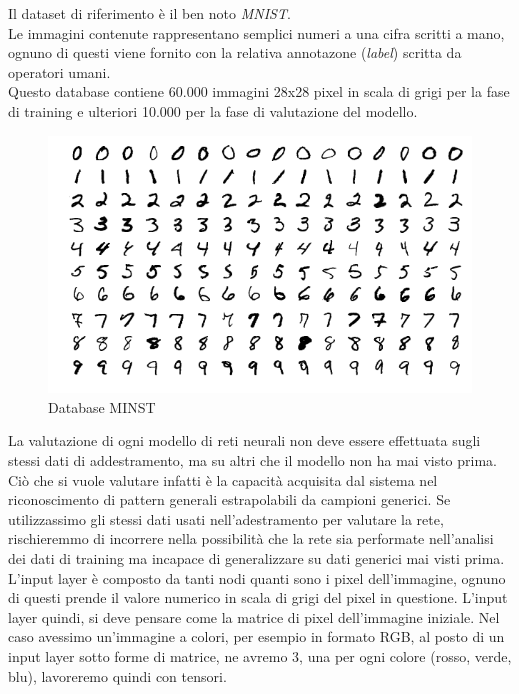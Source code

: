 \documentclass[12pt,a4paper,openright,twoside]{report}
\begin{document}
Il dataset di riferimento è il ben noto \emph{MNIST}.\\
Le immagini contenute rappresentano semplici numeri a una cifra scritti a mano, ognuno di questi viene fornito con la relativa annotazone (\emph{label}) scritta da operatori umani.\\
Questo database contiene 60.000 immagini 28x28 pixel in scala di grigi per la fase di training e ulteriori 10.000 per la fase di valutazione del modello. \\
\begin{figure}[h]
\centering
\includegraphics[width=\linewidth]{minst.png}
\caption{Database MINST}
\end{figure}
La valutazione di ogni modello di reti neurali non deve essere effettuata sugli stessi dati di addestramento, ma su altri che il modello non ha mai visto prima. Ciò che si vuole valutare infatti è la capacità acquisita dal sistema nel riconoscimento di pattern generali estrapolabili da campioni generici. Se utilizzassimo gli stessi dati usati nell'adestramento per valutare la rete, rischieremmo di incorrere nella possibilità che la rete sia performate nell'analisi dei dati di training ma incapace di generalizzare su dati generici mai visti prima.   \\
\newpage
L'input layer è composto da tanti nodi quanti sono i pixel dell'immagine, ognuno di questi prende il valore numerico in scala di grigi del pixel in questione.
L'input layer quindi, si deve pensare come la matrice di pixel dell'immagine iniziale. Nel caso avessimo un'immagine a colori, per esempio in formato RGB, al posto di un input layer sotto forme di matrice, ne avremo 3, una per ogni colore (rosso, verde, blu), lavoreremo quindi con tensori.\\
\newpage
\end{document}
